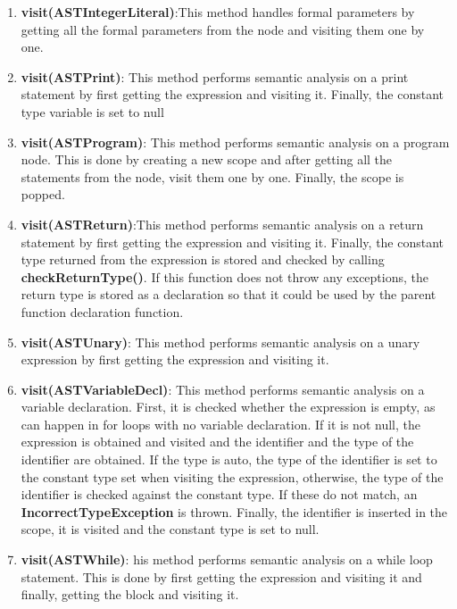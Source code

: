 \documentclass{article}
\begin{document}
\begin{enumerate}
					\item \textbf{visit(ASTIntegerLiteral)}:This method handles formal parameters by getting all the formal parameters from the node and visiting them one by one.
					
					\item \textbf{visit(ASTPrint)}: This method performs semantic analysis on a print statement by first getting the expression and visiting it. Finally, the constant type variable is set to null
					
					\item \textbf{visit(ASTProgram)}: This method performs semantic analysis on a program node. This is done by creating a new scope and after getting all the statements from the node, visit them one by one. Finally, the scope is popped.
					
					\item \textbf{visit(ASTReturn)}:This method performs semantic analysis on a return statement by first getting the expression and visiting it. Finally, the constant type returned from the expression is stored and checked by calling \textbf{checkReturnType()}. If this function does not throw any exceptions, the return type is stored as a declaration so that it could be used by the parent function declaration function.
			
					\item \textbf{visit(ASTUnary)}: This method performs semantic analysis on a unary expression by first getting the expression and visiting it.
										
				\item \textbf{visit(ASTVariableDecl)}: This method performs semantic analysis on a variable declaration. First, it is checked whether the expression is empty, as can happen in for loops with no variable declaration. If it is not null, the expression is obtained and visited and the identifier and the type of the identifier are obtained. If the type is auto, the type of the identifier is set to the constant type set when visiting the expression, otherwise, the type of the identifier is checked against the constant type. If these do not match, an \textbf{IncorrectTypeException} is thrown. Finally, the identifier is inserted in the scope, it is visited and the constant type is set to null.
						
						\item \textbf{visit(ASTWhile)}: his method performs semantic analysis on a while loop statement. This is done by first getting the expression and visiting it and finally, getting the block and visiting it.
	

\end{enumerate}
\end{document}
